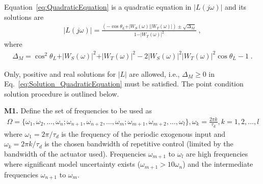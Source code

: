 \documentclass[12pt,draftcls,onecolumn]{IEEEtran}
\begin{document}
Equation~\eqref{eq:QuadraticEquation} is a quadratic equation in $\vert L(j\omega) \vert$ and its solutions are
\begin{align}
	\vert L(j\omega) \vert = \frac{( -\cos{\theta_L} + \vert W_{S}(\omega) \vert \vert W_{T}(\omega) \vert )\pm\sqrt{\Delta_{M}}}{1 - \vert W_{T}(\omega) \vert^2} \;, \label{eq:Solution_QuadraticEquation}
\end{align}
where
\begin{align}
	\Delta_{M}=\cos^{2}{\theta_L} + \vert W_{S}(\omega) \vert^{2} + \vert W_{T}(\omega) \vert^{2} - 2\vert W_{S}(\omega) \vert^{2} \vert W_{T}(\omega) \vert^{2}\cos{\theta_{L}}-1 \;. \label{eq:Determinant}
\end{align}

Only, positive and real solutions for $\vert L \vert$ are allowed, i.e., $\Delta_{M}\geq0$ in Eq.~\eqref{eq:Solution_QuadraticEquation} must be satisfied. The point condition solution procedure is outlined below.

\textbf{M1.} Define the set of frequencies to be used as
\begin{align*}
	\Omega=\big\{\omega_{1},\omega_{2},\ldots,\omega_{n};\omega_{n+1},\omega_{n+2},\ldots,\omega_{m}; \omega_{m+1},\omega_{m+2},\ldots,\omega_{l} \big\},\omega_{k}=\frac{2\pi
k}{\tau_{d}}, k=1,2,\ldots,l 
\end{align*}
where $\omega_{1}=2\pi/\tau_{d}$ is the frequency of the periodic
exogenous input and  $\omega_{k}=2\pi k/\tau_{d}$ is the chosen
bandwidth of repetitive control (limited by the bandwidth of the
actuator used). Frequencies $\omega_{m+1}$ to $\omega_{l}$ are
high frequencies where significant model uncertainty exists
($\omega_{m+1}>10\omega_{n}$) and the intermediate frequencies
$\omega_{n+1}$ to $\omega_{m}$.
\end{document}
